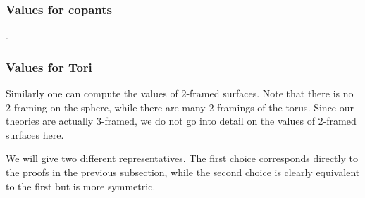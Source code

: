 \documentclass{amsart}
\begin{document}
\subsubsection{Values for copants}

. %

\subsubsection{Values for Tori}

Similarly one can compute the values of $2$-framed surfaces.  Note that there is no $2$-framing on the sphere, while there are many $2$-framings of the torus.  Since our theories are actually $3$-framed, we do not go into detail on the values of $2$-framed surfaces here.
 


 
We will give two different representatives.  The first choice corresponds directly to the proofs in the previous subsection, while the second choice is clearly equivalent to the first but is more symmetric.
\end{document}
